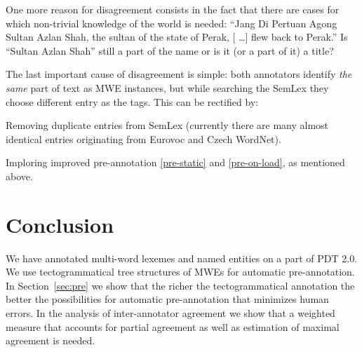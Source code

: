 One more reason for disagreement consists in the fact that there are cases for which non-trivial knowledge of the world is needed: ``Jang Di Pertuan Agong Sultan Azlan Shah, the sultan of the state of Perak, [\kern 2pt \ldots] flew back to Perak.'' Is ``Sultan Azlan Shah'' still a part of the name or is it (or a part of it) a title?

The last important cause of disagreement is simple: both annotators identify {\em the same} part of text as MWE instances, but while searching the SemLex they choose different entry as the tags. This can be rectified by:
	\begin{compactitem}
		\item Removing duplicate entries from SemLex (currently there are many almost identical entries originating from Eurovoc and Czech WordNet).
		\item Imploring improved pre-annotation \ref{pre-static} and \ref{pre-on-load}, as mentioned above.
	\end{compactitem}




\section{Conclusion}

We have annotated multi-word lexemes and named entities on a part of PDT 2.0. We use tectogrammatical tree structures of MWEs for automatic pre-annotation. In Section~\ref{sec:pre} we show that the richer the tectogrammatical annotation the better the possibilities for automatic pre-annotation that minimizes human errors. In the analysis of inter-annotator agreement we show that a weighted measure that accounts for partial agreement as well as estimation of maximal agreement is needed. 

